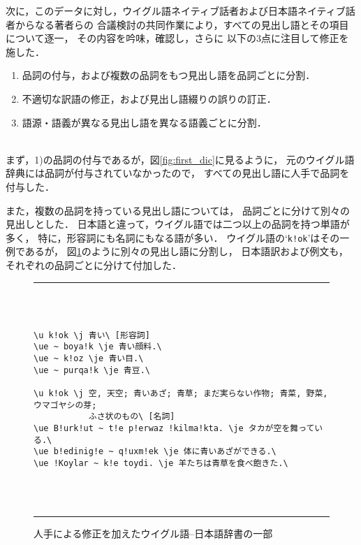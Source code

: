 次に，このデータに対し，ウイグル語ネイティブ話者および日本語ネイティブ話者からなる著者らの
合議検討の共同作業により，すべての見出し語とその項目について逐一，
その内容を吟味，確認し，さらに
以下の3点に注目して修正を施した．\\

\begin{enumerate}
 \item[1)] 品詞の付与，および複数の品詞をもつ見出し語を品詞ごとに分割．
 \item[2)] 不適切な訳語の修正，および見出し語綴りの誤りの訂正．
 \item[3)] 語源・語義が異なる見出し語を異なる語義ごとに分割．
\end{enumerate}

\mbox{} \\
まず，1)の品詞の付与であるが，図\ref{fig:first_dic}に見るように，
元のウイグル語辞典\cite{UJDIC}には品詞が付与されていなかったので，
すべての見出し語に人手で品詞を付与した．

また，複数の品詞を持っている見出し語については，
品詞ごとに分けて別々の見出しとした．
日本語と違って，ウイグル語では二つ以上の品詞を持つ単語が
多く，
特に，形容詞にも名詞にもなる語が多い．
ウイグル語の`\verb+k!ok+'はその一例であるが，
図\ref{fig:arranged_dic}のように別々の見出し語に分割し，
日本語訳および例文も，それぞれの品詞ごとに分けて付加した．

\begin{figure}[tbp] 
\begin{center}
\rule{0.9\textwidth}{0.2mm} \\ \mbox{} \\
\begin{minipage}{0.9\textwidth}
\small
\begin{verbatim}
\u k!ok \j 青い\ [形容詞]
\ue ~ boya!k \je 青い顔料.\
\ue ~ k!oz \je 青い目.\
\ue ~ purqa!k \je 青豆.\

\u k!ok \j 空, 天空; 青いあざ; 青草; まだ実らない作物; 青菜, 野菜, ウマゴヤシの芽; 
           ふさ状のもの\ [名詞]
\ue B!urk!ut ~ t!e p!erwaz !kilma!kta. \je タカが空を舞っている.\
\ue b!edinig!e ~ q!uxm!ek \je 体に青いあざができる.\
\ue !Koylar ~ k!e toydi. \je 羊たちは青草を食べ飽きた.\
\end{verbatim}
\end{minipage} \\ \mbox{} \\ 
\rule{0.9\textwidth}{0.2mm} \vspace{-1.6ex}
\end{center}
\caption{人手による修正を加えたウイグル語--日本語辞書の一部} 
\label{fig:arranged_dic}
\end{figure} 


